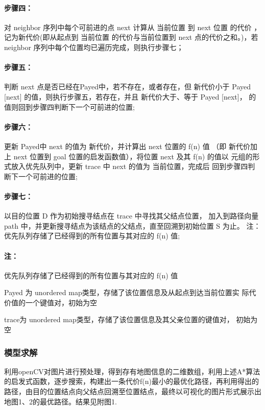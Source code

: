 \documentclass[withoutpreface,bwprint]{cumcmthesis} %
\begin{document}
\paragraph{步骤四：}
对 neighbor 序列中每个可前进的点 next 计算从 当前位置 到 next 位置 的代价 ，记为新代价(即从起点到 当前位置 的代价与当前位置到 next 点的代价之和。)，若 neighbor 序列中每个位置均已遍历完成，则执行步骤七； 

\paragraph{步骤五：}
判断 next 点是否已经在Payed中，若不存在，或者存在，但 新代价小于 Payed [next] 的值，则执行步骤五，若存在，并且 新代价大于、等于 Payed [next]， 的值则回到步骤四判断下一个可前进的位置;

\paragraph{步骤六：}
更新 Payed中 next 的值为 新代价，并计算出 next 位置的 f(n) 值 （即 新代价加上 next 位置到 goal 位置的启发函数值），将位置 next 及其 f(n) 的值以 元组的形式放入优先队列中，更新 trace 中 next 的值为 当前位置，完成后 回到步骤四判断下一个可前进的位置;

\paragraph{步骤七：}
以目的位置 D 作为初始搜寻结点在 trace 中寻找其父结点位置， 加入到路径向量 path 中，并更新搜寻结点为该结点的父结点，直至回溯到初始位置 S 为止。 
注：优先队列存储了已经得到的所有位置与其对应的 f(n) 值;

\paragraph{注：}
优先队列存储了已经得到的所有位置与其对应的 f(n) 值 

\hspace*{1.1cm}
Payed 为 unordered map类型，存储了该位置信息及从起点到达当前位置实 际代价值的一个键值对，初始为空 

\hspace*{1.1cm}
trace为 unordered map类型，存储了该位置信息及其父亲位置的键值对， 初始为空



\subsubsection{模型求解}
利用openCV对图片进行预处理，得到存有地图信息的二维数组，利用上述A*算法的启发式函数，逐步搜索，构建出一条代价f(n)最小的最优化路径，再利用得出的路径，由目的位置结点向父结点回溯至位置结点，最终以可视化的图片形式展示出地图1、2的最优路径。结果见附图1.
\end{document}

